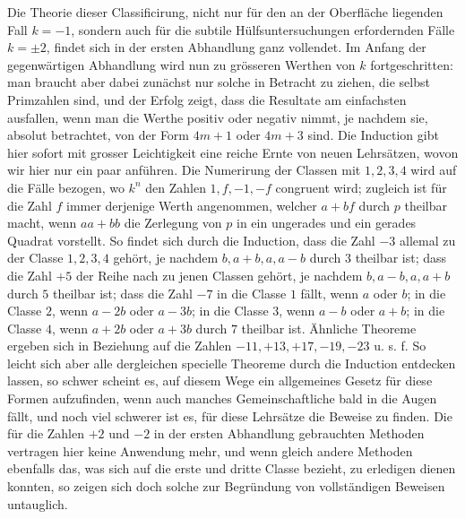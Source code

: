 \documentclass[12pt]{article}
\begin{document}
Die Theorie dieser Classificirung, nicht nur für den an der Oberfläche liegenden Fall $k=-1$, sondern auch für die subtile Hülfsuntersuchungen erfordernden Fälle $k=\pm2$, findet sich in der ersten Abhandlung ganz vollendet. Im Anfang der gegenwärtigen Abhandlung wird nun zu grösseren Werthen von $k$ fortgeschritten: man braucht aber dabei zunächst nur solche in Betracht zu ziehen, die selbst Primzahlen sind, und der Erfolg zeigt, dass die Resultate am einfachsten ausfallen, wenn man die Werthe positiv oder negativ nimmt, je nachdem sie, absolut betrachtet, von der Form $4m+1$ oder $4m+3$ sind. Die Induction gibt hier sofort mit grosser Leichtigkeit eine reiche Ernte von neuen Lehrsätzen, wovon wir hier nur ein paar anführen. Die Numerirung der Classen mit $1,2,3,4$ wird auf die Fälle bezogen, wo $k^n$ den Zahlen $1,f,-1,-f$ congruent wird; zugleich ist für die Zahl $f$ immer derjenige Werth angenommen, welcher $a+bf$ durch $p$ theilbar macht, wenn $aa+bb$ die Zerlegung von $p$ in ein ungerades und ein gerades Quadrat vorstellt. So findet sich durch die Induction, dass die Zahl $-3$ allemal zu der Classe $1,2,3,4$ gehört, je nachdem $b,a+b,a,a-b$ durch $3$ theilbar ist; dass die Zahl $+5$ der Reihe nach zu jenen Classen gehört, je nachdem $b,a-b,a,a+b$ durch $5$ theilbar ist; dass die Zahl $-7$ in die Classe $1$ fällt, wenn $a$ oder $b$; in die Classe $2$, wenn $a-2b$ oder $a-3b$; in die Classe $3$, wenn $a-b$ oder $a+b$; in die Classe $4$, wenn $a+2b$ oder $a+3b$ durch $7$ theilbar ist. Ähnliche Theoreme ergeben sich in Beziehung auf die Zahlen $-11,+13,+17,-19,-23$ u. s. f. So leicht sich aber alle dergleichen specielle Theoreme durch die Induction entdecken lassen, so schwer scheint es, auf diesem Wege ein allgemeines Gesetz für diese Formen aufzufinden, wenn auch manches Gemeinschaftliche bald in die Augen fällt, und noch viel schwerer ist es, für diese Lehrsätze die Beweise zu finden. Die für die Zahlen $+2$ und $-2$ in der ersten Abhandlung gebrauchten Methoden vertragen hier keine Anwendung mehr, und wenn gleich andere Methoden ebenfalls das, was sich auf die erste und dritte Classe bezieht, zu erledigen dienen konnten, so zeigen sich doch solche zur Begründung von vollständigen Beweisen untauglich.
\end{document}
